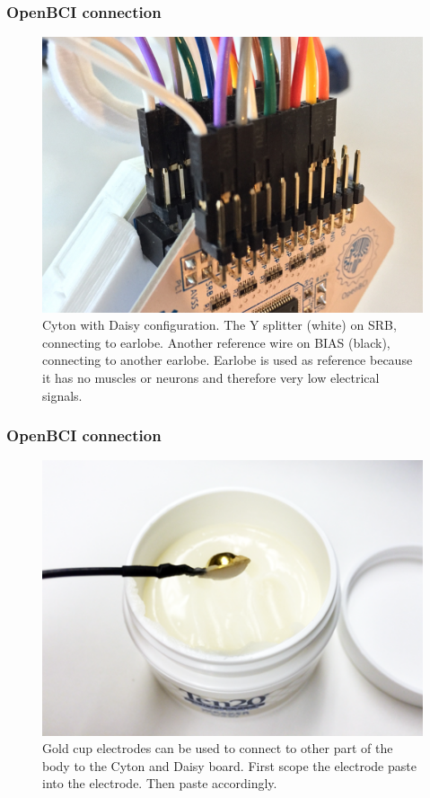 \documentclass{beamer}
\begin{document}
\begin{frame}
\frametitle{OpenBCI connection}
\begin{figure}
	\includegraphics[width=0.6\linewidth]{image/openbci}
	\caption{Cyton with Daisy configuration.  The Y splitter (white) on SRB,  connecting to earlobe.  Another reference wire on BIAS (black), connecting to another earlobe.  Earlobe is used as reference because it has no muscles or neurons and therefore very low electrical signals. }
\end{figure}
\end{frame}

\begin{frame}
\frametitle{OpenBCI connection}
\begin{figure}
	\includegraphics[width=0.6\linewidth]{image/gold}
	\caption{Gold cup electrodes can be used to connect to other part of the body to the Cyton and Daisy board.   First scope the electrode paste into the electrode.    Then paste accordingly.}
\end{figure}
\end{frame}
\end{document}
